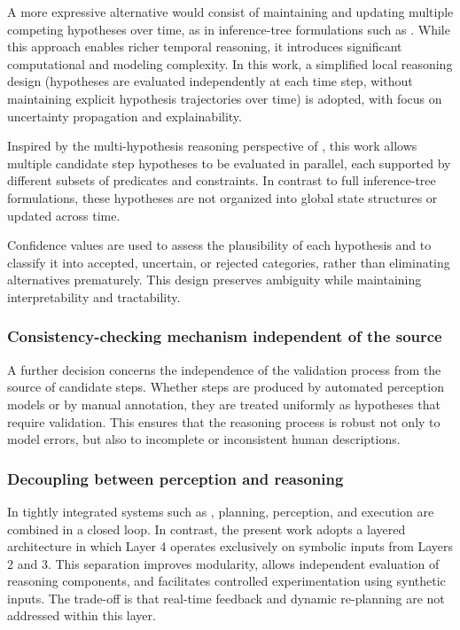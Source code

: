 \documentclass[11pt,titlepage,openright]{book}
\begin{document}
A more expressive alternative would consist of maintaining and updating multiple competing hypotheses over time, as in inference-tree formulations such as \citet{WangEtAl2018}. While this approach enables richer temporal reasoning, it introduces significant computational and modeling complexity. In this work, a simplified local reasoning design (hypotheses are evaluated independently at each time step, without maintaining explicit hypothesis trajectories over time) is adopted, with focus on uncertainty propagation and explainability.

Inspired by the multi-hypothesis reasoning perspective of \citet{WangEtAl2018}, this work allows multiple candidate step hypotheses to be evaluated in parallel, each supported by different subsets of predicates and constraints. In contrast to full inference-tree formulations, these hypotheses are not organized into global state structures or updated across time.

Confidence values are used to assess the plausibility of each hypothesis and to classify it into accepted, uncertain, or rejected categories, rather than eliminating alternatives prematurely. This design preserves ambiguity while maintaining interpretability and tractability.


\subsubsection{Consistency-checking mechanism independent of the source}
A further decision concerns the independence of the validation process from the source of candidate steps. Whether steps are produced by automated perception models or by manual annotation, they are treated uniformly as hypotheses that require validation. This ensures that the reasoning process is robust not only to model errors, but also to incomplete or inconsistent human descriptions.

\subsubsection{Decoupling between perception and reasoning}
In tightly integrated systems such as \citep{Zhao2025VideoToBT}, planning, perception, and execution are combined in a closed loop. In contrast, the present work adopts a layered architecture in which Layer 4 operates exclusively on symbolic inputs from Layers 2 and 3. This separation improves modularity, allows independent evaluation of reasoning components, and facilitates controlled experimentation using synthetic inputs. The trade-off is that real-time feedback and dynamic re-planning are not addressed within this layer.
\end{document}
